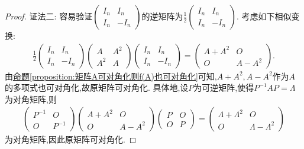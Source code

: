 \documentclass[../../main.tex]{subfiles}%
\begin{document}
\begin{proof}
{\color{blue}证法二:}
容易验证$\begin{pmatrix}I_n&I_n\\I_n&-I_n\end{pmatrix}$的逆矩阵为$\frac{1}{2}\begin{pmatrix}I_n&I_n\\I_n&-I_n\end{pmatrix}$. 考虑如下相似变换:
\begin{align*}
\frac{1}{2}\begin{pmatrix}I_n&I_n\\I_n&-I_n\end{pmatrix}\begin{pmatrix}A&A^2\\A^2&A\end{pmatrix}\begin{pmatrix}I_n&I_n\\I_n&-I_n\end{pmatrix}=\begin{pmatrix}A + A^2&O\\O&A - A^2\end{pmatrix}.
\end{align*}
由\hyperref[proposition:矩阵A可对角化则f(A)也可对角化]{命题\ref{proposition:矩阵A可对角化则f(A)也可对角化}}可知,$A + A^2,A - A^2$作为$A$的多项式也可对角化,故原矩阵可对角化. 具体地,设$P$为可逆矩阵,使得$P^{-1}AP=\Lambda$为对角矩阵,则
\begin{align*}
\begin{pmatrix}P^{-1}&O\\O&P^{-1}\end{pmatrix}\begin{pmatrix}A + A^2&O\\O&A - A^2\end{pmatrix}\begin{pmatrix}P&O\\O&P\end{pmatrix}=\begin{pmatrix}\Lambda+\Lambda^2&O\\O&\Lambda - \Lambda^2\end{pmatrix}
\end{align*}
为对角矩阵,因此原矩阵可对角化.
\end{proof}
\end{document}
